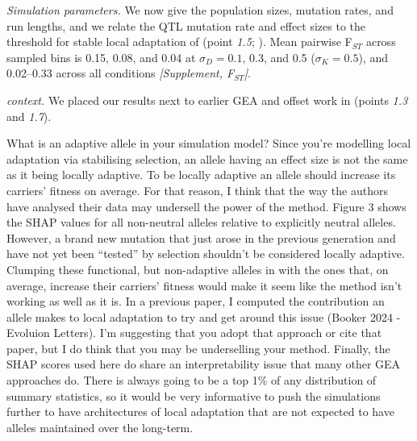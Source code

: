 {\textit{Simulation parameters.} We now give the population sizes, mutation
rates, and run lengths, and we relate the QTL mutation rate and effect sizes
to the threshold for stable local adaptation of
\citet{sakamoto_mutation_2024} (point \textit{1.5};
). Mean pairwise F$_{ST}$ across sampled bins is
0.15, 0.08, and 0.04 at $\sigma_D = 0.1$, 0.3, and 0.5 ($\sigma_K = 0.5$),
and 0.02--0.33 across all conditions \textit{[Supplement, F$_{ST}$]}.

\textit{\dfir context.} We placed our results next to earlier GEA and
offset work in \dfir (points \textit{1.3} and \textit{1.7}).}

\begin{point}{} %
What is an adaptive allele in your simulation model? Since you're modelling local adaptation via stabilising selection, an allele having an effect size is not the same as it being locally adaptive. To be locally adaptive an allele should increase its carriers' fitness on average. For that reason, I think that the way the authors have analysed their data may undersell the power of the method. Figure 3 shows the SHAP values for all non-neutral alleles relative to explicitly neutral alleles. However, a brand new mutation that just arose in the previous generation and have not yet been ``tested'' by selection shouldn't be considered locally adaptive. Clumping these functional, but non-adaptive alleles in with the ones that, on average, increase their carriers' fitness would make it seem like the method isn't working as well as it is. In a previous paper, I computed the contribution an allele makes to local adaptation to try and get around this issue (Booker 2024 - Evoluion Letters). I'm suggesting that you adopt that approach or cite that paper, but I do think that you may be underselling your method. Finally, the SHAP scores used here do share an interpretability issue that many other GEA approaches do. There is always going to be a top 1\% of any distribution of summary statistics, so it would be very informative to push the simulations further to have architectures of local adaptation that are not expected to have alleles maintained over the long-term.
\end{point}


